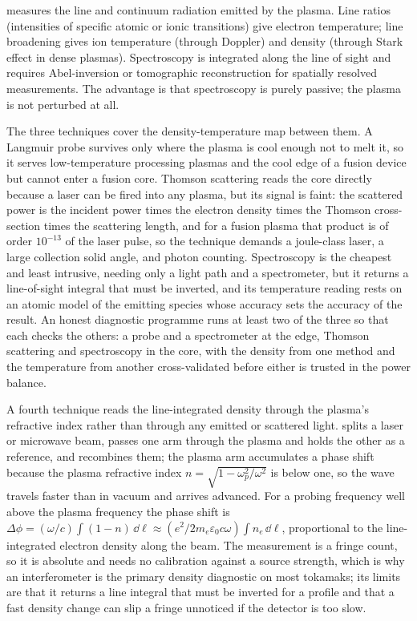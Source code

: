  measures the line and continuum radiation
emitted by the plasma. Line ratios (intensities of specific atomic
or ionic transitions) give electron temperature; line broadening
gives ion temperature (through Doppler) and density (through Stark
effect in dense plasmas). Spectroscopy is integrated along the line
of sight and requires Abel-inversion or tomographic reconstruction
for spatially resolved measurements. The advantage is that
spectroscopy is purely passive; the plasma is not perturbed at all.

The three techniques cover the density-temperature map between them. A
Langmuir probe survives only where the plasma is cool enough not to melt it,
so it serves low-temperature processing plasmas and the cool edge of a fusion
device but cannot enter a fusion core. Thomson scattering reads the core
directly because a laser can be fired into any plasma, but its signal is faint:
the scattered power is the incident power times the electron density times the
Thomson cross-section times the scattering length, and for a fusion plasma that
product is of order $10^{-13}$ of the laser pulse, so the technique demands a
joule-class laser, a large collection solid angle, and photon counting.
Spectroscopy is the cheapest and least intrusive, needing only a light path and
a spectrometer, but it returns a line-of-sight integral that must be inverted,
and its temperature reading rests on an atomic model of the emitting species
whose accuracy sets the accuracy of the result. An honest diagnostic programme
runs at least two of the three so that each checks the others: a probe and a
spectrometer at the edge, Thomson scattering and spectroscopy in the core, with
the density from one method and the temperature from another cross-validated
before either is trusted in the power balance.

A fourth technique reads the line-integrated density through the plasma's
refractive index rather than through any emitted or scattered light.
 splits a laser or microwave beam, passes one arm
through the plasma and holds the other as a reference, and recombines them; the
plasma arm accumulates a phase shift because the plasma refractive index $n =
\sqrt{1-\omega_p^{2}/\omega^{2}}$ is below one, so the wave travels faster than
in vacuum and arrives advanced. For a probing frequency well above the plasma
frequency the phase shift is $\Delta\phi = (\omega/c)\int(1-n)\,\dd\ell
\approx (e^{2}/2m_e\varepsilon_0 c\omega)\int n_e\,\dd\ell$, proportional to the
line-integrated electron density along the beam. The measurement is a fringe
count, so it is absolute and needs no calibration against a source strength,
which is why an interferometer is the primary density diagnostic on most
tokamaks; its limits are that it returns a line integral that must be inverted
for a profile and that a fast density change can slip a fringe unnoticed if the
detector is too slow.

